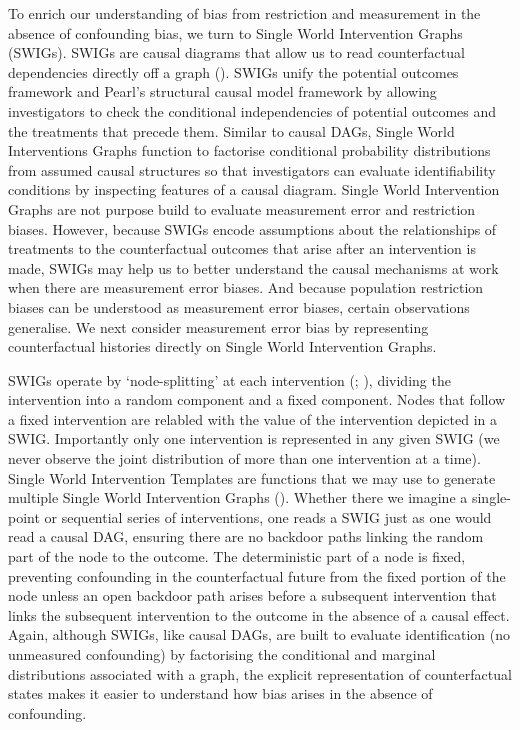\documentclass[
  single column]{article}
\begin{document}
To enrich our understanding of bias from restriction and measurement in
the absence of confounding bias, we turn to Single World Intervention
Graphs (SWIGs). SWIGs are causal diagrams that allow us to read
counterfactual dependencies directly off a graph
(). SWIGs
unify the potential outcomes framework and Pearl's structural causal
model framework by allowing investigators to check the conditional
independencies of potential outcomes and the treatments that precede
them. Similar to causal DAGs, Single World Interventions Graphs function
to factorise conditional probability distributions from assumed causal
structures so that investigators can evaluate identifiability conditions
by inspecting features of a causal diagram. Single World Intervention
Graphs are not purpose build to evaluate measurement error and
restriction biases. However, because SWIGs encode assumptions about the
relationships of treatments to the counterfactual outcomes that arise
after an intervention is made, SWIGs may help us to better understand
the causal mechanisms at work when there are measurement error biases.
And because population restriction biases can be understood as
measurement error biases, certain observations generalise. We next
consider measurement error bias by representing counterfactual histories
directly on Single World Intervention Graphs.

SWIGs operate by `node-splitting' at each intervention
(;
), dividing
the intervention into a random component and a fixed component. Nodes
that follow a fixed intervention are relabled with the value of the
intervention depicted in a SWIG. Importantly only one intervention is
represented in any given SWIG (we never observe the joint distribution
of more than one intervention at a time). Single World Intervention
Templates are functions that we may use to generate multiple Single
World Intervention Graphs
().
Whether there we imagine a single-point or sequential series of
interventions, one reads a SWIG just as one would read a causal DAG,
ensuring there are no backdoor paths linking the random part of the node
to the outcome. The deterministic part of a node is fixed, preventing
confounding in the counterfactual future from the fixed portion of the
node unless an open backdoor path arises before a subsequent
intervention that links the subsequent intervention to the outcome in
the absence of a causal effect. Again, although SWIGs, like causal DAGs,
are built to evaluate identification (no unmeasured confounding) by
factorising the conditional and marginal distributions associated with a
graph, the explicit representation of counterfactual states makes it
easier to understand how bias arises in the absence of confounding.
\end{document}
